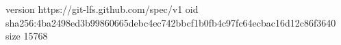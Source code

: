 version https://git-lfs.github.com/spec/v1
oid sha256:4ba2498ed3b99860665debc4ec742bbcf1b0fb4c97fc64ecbac16d12c86f3640
size 15768
